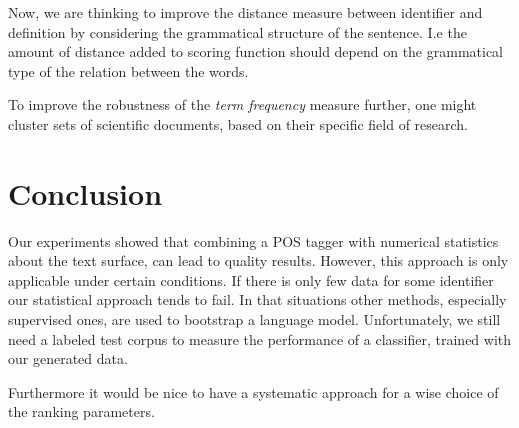 \documentclass[runningheads]{llncs}
\begin{document}
Now, we are thinking to improve the distance measure between identifier and definition by considering the grammatical structure of the sentence. I.e the amount of distance added to scoring function should depend on the grammatical type of the relation between the words.

To improve the robustness of the \emph{term frequency} measure further, one
might cluster sets of scientific documents, based on their specific field of
research.


\section{Conclusion}
Our experiments showed that combining a POS tagger with numerical statistics
about the text surface, can lead to quality results. However, this approach is
only applicable under certain conditions. 
If there is only few data for some identifier our statistical approach tends to fail. In that situations other methods, especially supervised ones, are used to
bootstrap a language model. Unfortunately, we still need a labeled test
corpus to measure the performance of a classifier, trained with our generated
data.

Furthermore it would be nice to have a systematic approach for a wise choice of the ranking parameters.

\begingroup
\let\clearpage\relax

\endgroup
\end{document}
